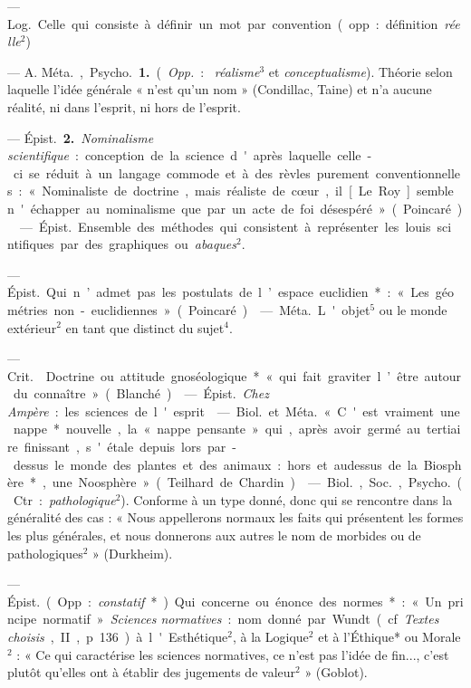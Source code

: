 \begin{itemize}[leftmargin=1cm, label=, itemsep=1pt]
 — \si{Log.} Celle qui consiste à définir un mot
par convention (opp. : définition {\it réelle}$^2$)

 — A. \si{Méta.}, \si{Psycho.} {\bf 1.} ({\it Opp.} : {\it
réalisme}$^3$ et {\it conceptualisme}). Théorie selon laquelle l’idée générale
« n’est qu’un nom » (Condillac, Taine) et n'a aucune réalité, ni dans
l'esprit, ni hors de l'esprit.

— \si{Épist.} {\bf 2.} {\it Nominalisme scientifique} : conception de la
science d'après laquelle celle-ci se réduit à un langage commode et à des
rèvles purement conventionnelles : « Nominaliste de doctrine, mais réaliste
de cœur, il [Le Roy] semble n'échapper au nominalisme que par un acte de foi
désespéré » (Poincaré).

 — \si{Épist.} Ensemble des méthodes qui consistent à
représenter les louis sci ntifiques par des graphiques ou {\it abaques}$^2$.

 — \si{Épist.} Qui n’admet pas les postulats de l’espace
euclidien* : « Les géométries non-euclidiennes » (Poincaré).

 — \si{Méta.} L'objet$^5$ ou le
monde extérieur$^2$ en tant que distinct du sujet$^4$.

 — \si{Crit.}  Doctrine ou attitude
gnoséologique* « qui fait graviter l’être autour du connaître» (Blanché).

 — \si{Épist.} {\it Chez
Ampère} : les sciences de l'esprit.

 — \si{Biol.} et \si{Méta.} « C'est vraiment une nappe*
nouvelle, la « nappe pensante » qui, après avoir germé au tertiaire
finissant, s'étale depuis lors par-dessus le monde des plantes et des
animaux : hors et audessus de la Biosphère*, une Noosphère » (Teilhard de
Chardin).

 — \si{Biol.}, \si{Soc.}, \si{Psycho.} (Ctr. :
{\it pathologique}$^2$). Conforme à un type donné, donc qui se rencontre dans
la généralité des cas : « Nous appellerons normaux les faits qui présentent
les formes les plus générales, et nous donnerons aux autres le
nom de morbides ou de pathologiques$^2$ » (Durkheim).

 — \si{Épist.} (Opp. : {\it constatif}*) Qui concerne ou énonce
des normes*: « Un principe normatif ». {\it Sciences normatives} : nom donné
par Wundt (cf. {\it Textes choisis}, II, p. 136) à l'Esthétique$^2$, à la
Logique$^2$ et à l'Éthique* ou Morale$^2$ : « Ce qui caractérise les sciences
normatives, ce n’est pas l'idée de fin..., c’est plutôt qu’elles ont à
établir des jugements de valeur$^2$ » (Goblot).


\end{itemize}
